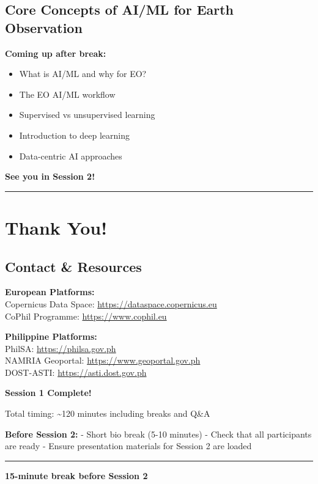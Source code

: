 \documentclass[
  letterpaper,
  DIV=11,
  numbers=noendperiod]{scrartcl}
\providecommand{\tightlist}{%
  \setlength{\itemsep}{0pt}\setlength{\parskip}{0pt}}
\begin{document}
\subsection{Core Concepts of AI/ML for Earth
Observation}\label{core-concepts-of-aiml-for-earth-observation}

\textbf{Coming up after break:}

\begin{itemize}
\tightlist
\item
  What is AI/ML and why for EO?
\item
  The EO AI/ML workflow
\item
  Supervised vs unsupervised learning
\item
  Introduction to deep learning
\item
  Data-centric AI approaches
\end{itemize}

\textbf{See you in Session 2! 🚀}

\begin{center}\rule{0.5\linewidth}{0.5pt}\end{center}

\section{Thank You!}\label{thank-you}

\subsection{Contact \& Resources}\label{contact-resources}

\textbf{European Platforms:}\\
Copernicus Data Space: \url{https://dataspace.copernicus.eu}\\
CoPhil Programme: \url{https://www.cophil.eu}

\textbf{Philippine Platforms:}\\
PhilSA: \url{https://philsa.gov.ph}\\
NAMRIA Geoportal: \url{https://www.geoportal.gov.ph}\\
DOST-ASTI: \url{https://asti.dost.gov.ph}

\textbf{Session 1 Complete!}

Total timing: \textasciitilde120 minutes including breaks and Q\&A

\textbf{Before Session 2:} - Short bio break (5-10 minutes) - Check that
all participants are ready - Ensure presentation materials for Session 2
are loaded

\begin{center}\rule{0.5\linewidth}{0.5pt}\end{center}

\textbf{15-minute break before Session 2}
\end{document}
